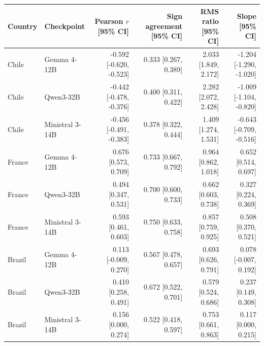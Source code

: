 \begin{tabular}{llrrrr}
\toprule
Country & Checkpoint & Pearson $r$ [95\% CI] & Sign agreement [95\% CI] & RMS ratio [95\% CI] & Slope [95\% CI] \\
\midrule
Chile & Gemma 4-12B & -0.592 [-0.620, -0.523] & 0.333 [0.267, 0.389] & 2.033 [1.849, 2.172] & -1.204 [-1.290, -1.020] \\
Chile & Qwen3-32B & -0.442 [-0.478, -0.376] & 0.400 [0.311, 0.422] & 2.282 [2.072, 2.428] & -1.009 [-1.104, -0.820] \\
Chile & Ministral 3-14B & -0.456 [-0.491, -0.383] & 0.378 [0.322, 0.444] & 1.409 [1.274, 1.531] & -0.643 [-0.709, -0.516] \\
France & Gemma 4-12B & 0.676 [0.573, 0.709] & 0.733 [0.667, 0.792] & 0.964 [0.862, 1.018] & 0.652 [0.514, 0.697] \\
France & Qwen3-32B & 0.494 [0.347, 0.531] & 0.700 [0.600, 0.733] & 0.662 [0.603, 0.738] & 0.327 [0.224, 0.369] \\
France & Ministral 3-14B & 0.593 [0.461, 0.603] & 0.750 [0.633, 0.758] & 0.857 [0.759, 0.925] & 0.508 [0.370, 0.521] \\
Brazil & Gemma 4-12B & 0.113 [-0.009, 0.270] & 0.567 [0.478, 0.657] & 0.693 [0.626, 0.791] & 0.078 [-0.007, 0.192] \\
Brazil & Qwen3-32B & 0.410 [0.258, 0.491] & 0.672 [0.522, 0.701] & 0.579 [0.524, 0.686] & 0.237 [0.149, 0.308] \\
Brazil & Ministral 3-14B & 0.156 [0.000, 0.274] & 0.522 [0.418, 0.597] & 0.753 [0.661, 0.863] & 0.117 [0.000, 0.215] \\
\bottomrule
\end{tabular}
